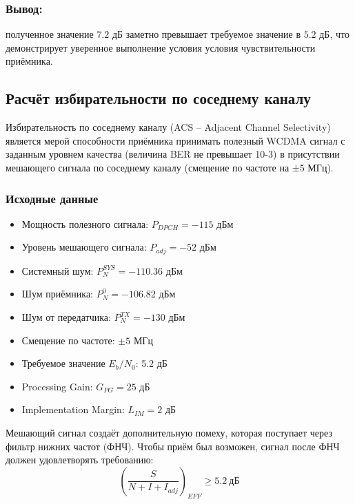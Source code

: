 \documentclass[a4paper,12pt]{article}
\begin{document}
\subsubsection{Вывод:} полученное значение $7.2$ дБ заметно превышает требуемое значение в $5.2$ дБ, что демонстрирует уверенное выполнение условия условия чувствительности приёмника.
\\




















\subsection{Расчёт избирательности по соседнему каналу}
Избирательность по соседнему каналу (ACS – Adjacent Channel Selectivity) является мерой способности приёмника принимать полезный WCDMA сигнал с заданным уровнем качества (величина BER не превышает 10-3) в присутствии мешающего сигнала по соседнему каналу (смещение по частоте на ±5 МГц).
\subsubsection{Исходные данные}
\begin{itemize}
\item Мощность полезного сигнала: $P_{DPCH} = -115$ дБм
\item Уровень мешающего сигнала: $P_{adj} = -52$ дБм
\item Системный шум: $P_{N}^{SYS} = -110.36$ дБм
\item Шум приёмника: $P_{N}^{0} = -106.82$ дБм
\item Шум от передатчика: $P_{N}^{TX} = -130$ дБм
\item Смещение по частоте: $\pm 5$ МГц
\item Требуемое значение $E_b/N_0$: 5.2 дБ
\item Processing Gain: $G_{PG} = 25$ дБ
\item Implementation Margin: $L_{IM} = 2$ дБ
\end{itemize}

Мешающий сигнал создаёт дополнительную помеху, которая поступает через фильтр нижних частот (ФНЧ). Чтобы приём был возможен, сигнал после ФНЧ должен удовлетворять требованию:
\begin{equation}
\left( \frac{S}{N + I + I_{adj}} \right)_{EFF} \geq 5.2\ \text{дБ}
\end{equation}
\end{document}
